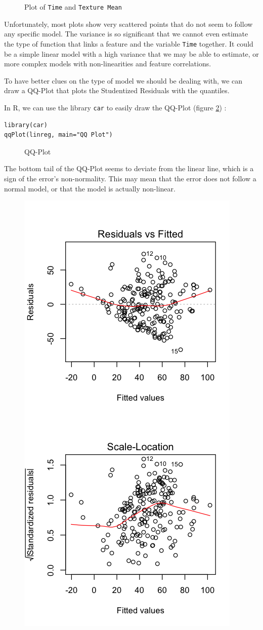 \documentclass[]{report}
\newcommand{\inputtikz}[2]{%
	\scalebox{#1}{}  
}
\begin{document}
\begin{figure}[!h]
	\centering
	\inputtikz{0.5}{Figures/time_feature_ex1.tex}
	\caption{Plot of \texttt{Time} and \texttt{Texture Mean} }
	\label{fig:time_feature_ex1}
\end{figure}

Unfortunately, most plots show very scattered points that do not seem to follow any specific model. The variance is so significant that we cannot even estimate the type of function that links a feature and the variable \texttt{Time} together. It could be a simple linear model with a high variance that we may be able to estimate, or more complex models with non-linearities and feature correlations.

To have better clues on the type of model we should be dealing with, we can draw a QQ-Plot that plots the Studentized Residuals with the quantiles. 

In R, we can use the library \texttt{car} to easily draw the QQ-Plot (figure \ref{fig:qq_plot}) :
\begin{lstlisting}
library(car)
qqPlot(linreg, main="QQ Plot")
\end{lstlisting}

\begin{figure}[!hb]
	\centering
	\inputtikz{0.5}{Figures/qq_plot.tex}
	\caption{QQ-Plot}
	\label{fig:qq_plot}
\end{figure}

The bottom tail of the QQ-Plot seems to deviate from the linear line, which is a sign of the error's non-normality. This may mean that the error does not follow a normal model, or that the model is actually non-linear.

\begin{figure}[!hb]
	\centering
	\includegraphics[width=0.5\linewidth]{Figures/fitted_value_plots}
	\caption{}
	\label{fig:fitted_value_plots}
\end{figure}
\end{document}
